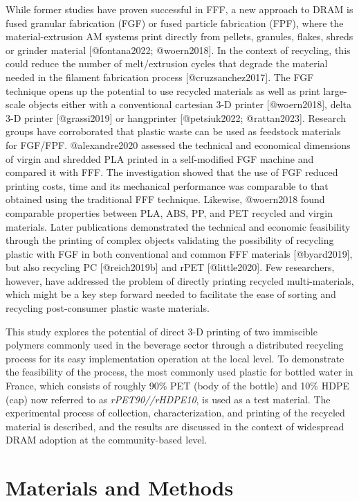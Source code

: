 \documentclass[
  letterpaper,
  DIV=11,
  numbers=noendperiod]{scrartcl}
\begin{document}
While former studies have proven successful in FFF, a new approach to
DRAM is fused granular fabrication (FGF) or fused particle fabrication
(FPF), where the material-extrusion AM systems print directly from
pellets, granules, flakes, shreds or grinder material {[}@fontana2022;
@woern2018{]}. In the context of recycling, this could reduce the number
of melt/extrusion cycles that degrade the material needed in the
filament fabrication process {[}@cruzsanchez2017{]}. The FGF technique
opens up the potential to use recycled materials as well as print
large-scale objects either with a conventional cartesian 3-D printer
{[}@woern2018{]}, delta 3-D printer {[}@grassi2019{]} or hangprinter
{[}@petsiuk2022; @rattan2023{]}. Research groups have corroborated that
plastic waste can be used as feedstock materials for FGF/FPF.
@alexandre2020 assessed the technical and economical dimensions of
virgin and shredded PLA printed in a self-modified FGF machine and
compared it with FFF. The investigation showed that the use of FGF
reduced printing costs, time and its mechanical performance was
comparable to that obtained using the traditional FFF technique.
Likewise, @woern2018 found comparable properties between PLA, ABS, PP,
and PET recycled and virgin materials. Later publications demonstrated
the technical and economic feasibility through the printing of complex
objects validating the possibility of recycling plastic with FGF in both
conventional and common FFF materials {[}@byard2019{]}, but also
recycling PC {[}@reich2019b{]} and rPET {[}@little2020{]}. Few
researchers, however, have addressed the problem of directly printing
recycled multi-materials, which might be a key step forward needed to
facilitate the ease of sorting and recycling post-consumer plastic waste
materials.

This study explores the potential of direct 3-D printing of two
immiscible polymers commonly used in the beverage sector through a
distributed recycling process for its easy implementation operation at
the local level. To demonstrate the feasibility of the process, the most
commonly used plastic for bottled water in France, which consists of
roughly 90\% PET (body of the bottle) and 10\% HDPE (cap) now referred
to as \emph{rPET90//rHDPE10}, is used as a test material. The
experimental process of collection, characterization, and printing of
the recycled material is described, and the results are discussed in the
context of widespread DRAM adoption at the community-based level.

\hypertarget{materials-and-methods}{%
\section{Materials and Methods}\label{materials-and-methods}}
\end{document}
